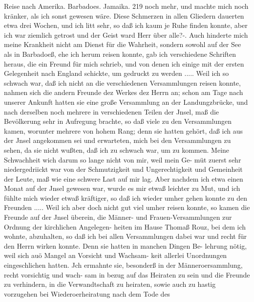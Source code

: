 Reise nach Amerika. Barbadoes. Jamaika. 219
noch mehr, und machte mich noch kränker, als ich sonst gewesen
wäre. Diese Schmerzen in allen Gliedern dauerten etwa drei
Wochen, und ich litt sehr, so daß ich kaum je Ruhe finden
konnte, aber ich war ziemlich getrost und der Geist ward Herr
über alle?-. Auch hinderte mich meine Krankheit nicht am Dienst
für die Wahrheit, sondern sowohl auf der See als in Barbadoeß,
ehe ich herum reisen konnte, gab ich verschiedene Schriften
heraus, die ein Freund für mich schrieb, und von denen ich einige
mit der ersten Gelegenheit nach England schickte, um gedruckt
zu werden .....
Weil ich so schwach war, daß ich nicht an die verschiedenen
Versammlungen reisen konnte, nahmen sich die andern Freunde
dez Werkes dez Herrn an; schon am Tage nach unserer Ankunft
hatten sie eine große Versammlung an der Landungzbrücke, und
nach derselben noch mehrere in verschiedenen Teilen der Jnsel,
maß die Bevölkerung sehr in Aufregung brachte, so daß viele zu
den Versammlungen kamen, worunter mehrere von hohem Rang;
denn sie hatten gehört, daß ich aus der Jnsel angekommen sei
und erwarteten, mich bei den Versammlungen zu sehen, da sie
nicht wußten, daß ich zu schwach war, um zu kommen. Meine
Schwachheit wich darum so lange nicht von mir, weil mein Ge-
müt zuerst sehr niedergedriickt war von der Schmutzigkeit und
Ungerechtigkeit und Gemeinheit der Leute, maß wie eine schwere
Last auf mir lag. Aber nachdem ich etwa einen Monat auf der
Jnsel gewesen war, wurde es mir etwaß leichter zu Mut, und
ich fühlte mich wieder etwaß kräftiger, so daß ich wieder umher
gehen konnte zu den Freunden .....
Weil ich aber doch nicht gut viel umher reisen konnte, so
kamen die Freunde auf der Jnsel überein, die Männer- und
Frauen-Versammlungen zur Ordnung der kirchlichen Angelegen-
heiten im Hause Thomaß Rouz, bei dem ich wohnte, abzuhalten,
so daß ich bei allen Versammlungen dabei war und recht für den
Herrn wirken konnte. Denn sie hatten in manchen Dingen Be-
lehrung nötig, weil sich auö Mangel an Vorsicht und Wachsam-
keit allerlei Unordnungen eingeschlichen hatten. Jch ermahnte sie,
besonderß in der Männeroersammlung, recht vorsichtig und wach-
sam in bezug auf das Heiraten zu sein und die Freunde zu
verhindern, in die Verwandtschaft zu heiraten, sowie auch zu
hastig vorzugehen bei Wiederoerheiratung nach dem Tode des

